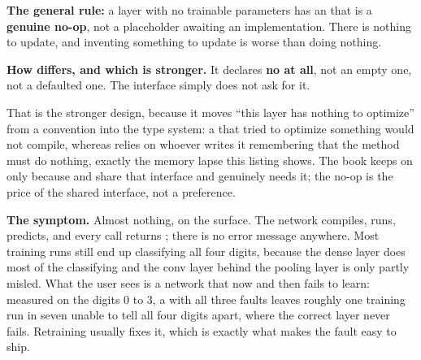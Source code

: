 \noindent\textbf{The general rule:} a layer with no trainable parameters has an 
that is a \textbf{genuine no-op}, not a placeholder awaiting an implementation. There is nothing to
update, and inventing something to update is worse than doing nothing. 

\textbf{How  differs, and which is stronger.} It declares \textbf{no
 at all}, not an empty one, not a defaulted one. The interface simply does not ask
for it.

That is the stronger design, because it moves ``this layer has nothing to optimize'' from a
convention into the type system: a  that tried to optimize something would not
compile, whereas  relies on whoever writes it remembering that the method must do
nothing, exactly the memory lapse this listing shows. The book keeps  on
 only because  and  share that interface and
 genuinely needs it; the no-op is the price of the shared interface, not a preference.

\textbf{The symptom.} Almost nothing, on the surface. The network compiles, runs, predicts, and every
call returns ; there is no error message anywhere. Most training runs still end up
classifying all four digits, because the dense layer does most of the classifying and the conv
layer behind the pooling layer is only partly misled. What the user sees is a network that now and
then fails to learn: measured on the digits 0 to 3, a  with all three faults leaves
roughly one training run in seven unable to tell all four digits apart, where the correct layer
never fails. Retraining usually fixes it, which is exactly what makes the fault easy to ship.

